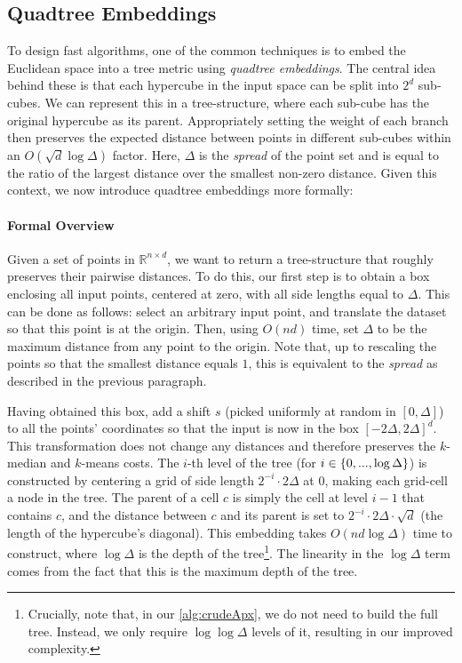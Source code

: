\subsection{Quadtree Embeddings}

To design fast algorithms, one of the common techniques is to embed the Euclidean space into a tree metric using \emph{quadtree embeddings}.  The central idea
behind these is that each hypercube in the input space can be split into $2^d$ sub-cubes. We can represent this in a tree-structure, where each sub-cube has the
original hypercube as its parent. Appropriately setting the weight of each branch then preserves the expected distance between points in different sub-cubes
within an $O(\sqrt{d} \log \Delta)$ factor. Here, $\Delta$ is the \emph{spread} of the point set and is equal to the ratio of the largest distance over the
smallest non-zero distance.  Given this context, we now introduce quadtree embeddings more formally:

\paragraph*{Formal Overview}

Given a set of points in $\mathbb{R}^{n \times d}$, we want to return a tree-structure that roughly preserves their pairwise distances.  To do this, our first
step is to obtain a box enclosing all input points, centered at zero, with all side lengths equal to $\Delta$. This can be done as follows: select an arbitrary
input point, and translate the dataset so that this point is at the origin. Then, using $O(nd)$ time, set $\Delta$ to be the maximum distance from any point to
the origin. Note that, up to rescaling the points so that the smallest distance equals $1$, this is equivalent to the \emph{spread} as described in the previous
paragraph.

Having obtained this box, add a shift $s$ (picked uniformly at random in $[0, \Delta]$) to all the points' coordinates so that the input is now in the box
$[-2\Delta, 2\Delta]^d$. This transformation does not change any distances and therefore preserves the $k$-median and $k$-means costs.  The $i$-th level of the
tree (for $i \in \left\{ 0, ..., \log \Delta \right\}$) is constructed by centering a grid of side length $2^{-i} \cdot 2\Delta$ at $0$, making each grid-cell a node
in the tree.  The parent of a cell $c$ is simply the cell at level $i-1$ that contains $c$, and the distance between $c$ and its parent is set to $2^{-i} \cdot
2\Delta \cdot \sqrt{d}$ (the length of the hypercube's diagonal). This embedding takes $O(nd \log \Delta)$ time to construct, where $\log \Delta$ is the depth
of the tree\footnote{Crucially, note that, in our \cref{alg:crudeApx}, we do not need to build the full tree.  Instead, we only require $\log \log \Delta$
levels of it, resulting in our improved complexity.}. The linearity in the $\log \Delta$ term comes from the fact that this is the maximum depth of the tree.


